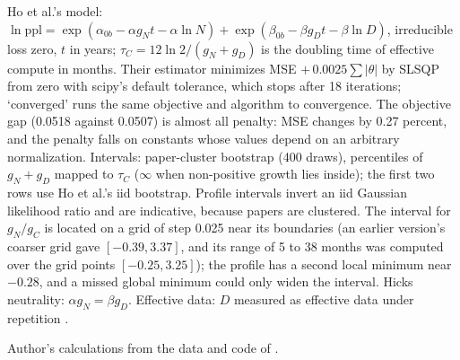 \begin{table}[tp]
\begin{tablenotes}
Ho et al.'s model: $\ln\text{ppl}=\exp(\alpha_{0b}-\alpha g_Nt-\alpha\ln N)+\exp(\beta_{0b}-\beta g_Dt-\beta\ln D)$, irreducible loss zero, $t$ in years; $\tau_C=12\ln2/(g_N+g_D)$ is the doubling time of effective compute in months. Their estimator minimizes MSE $+\,0.0025\sum|\theta|$ by SLSQP from zero with scipy's default tolerance, which stops after 18 iterations; `converged' runs the same objective and algorithm to convergence. The objective gap (0.0518 against 0.0507) is almost all penalty: MSE changes by 0.27 percent, and the penalty falls on constants whose values depend on an arbitrary normalization. Intervals: paper-cluster bootstrap (400 draws), percentiles of $g_N+g_D$ mapped to $\tau_C$ ($\infty$ when non-positive growth lies inside); the first two rows use Ho et al.'s iid bootstrap. Profile intervals invert an iid Gaussian likelihood ratio and are indicative, because papers are clustered. The interval for $g_N/g_C$ is located on a grid of step 0.025 near its boundaries (an earlier version's coarser grid gave $[-0.39,3.37]$, and its range of 5 to 38 months was computed over the grid points $[-0.25,3.25]$); the profile has a second local minimum near $-0.28$, and a missed global minimum could only widen the interval. Hicks neutrality: $\alpha g_N=\beta g_D$. Effective data: $D$ measured as effective data under repetition \citep{muennighoff2023scaling}.
\end{tablenotes}
\begin{tablenotes}[Source]
Author's calculations from the data and code of \citet{ho2024algorithmic}.
\end{tablenotes}
\end{table}
